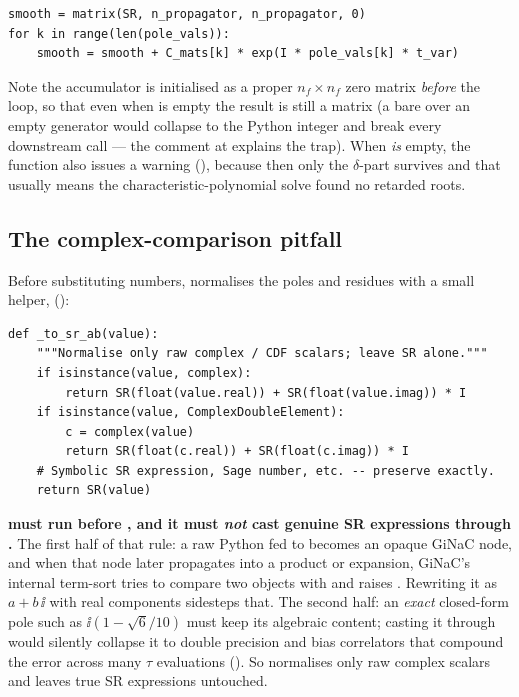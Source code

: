 \begin{lstlisting}
smooth = matrix(SR, n_propagator, n_propagator, 0)
for k in range(len(pole_vals)):
    smooth = smooth + C_mats[k] * exp(I * pole_vals[k] * t_var)
\end{lstlisting}

Note the accumulator is initialised as a proper $n_f \times n_f$ zero matrix
\emph{before} the loop, so that even when  is empty the result is
still a matrix (a bare  over an empty generator would collapse to the
Python integer  and break every downstream  call ---
the comment at  explains the trap). When
 \emph{is} empty, the function also issues a warning
(), because then only the $\delta$-part survives and
that usually means the characteristic-polynomial solve found no retarded roots.

\subsection{The complex-comparison pitfall}

Before substituting numbers,  normalises the poles and
residues with a small helper, 
():

\begin{lstlisting}
def _to_sr_ab(value):
    """Normalise only raw complex / CDF scalars; leave SR alone."""
    if isinstance(value, complex):
        return SR(float(value.real)) + SR(float(value.imag)) * I
    if isinstance(value, ComplexDoubleElement):
        c = complex(value)
        return SR(float(c.real)) + SR(float(c.imag)) * I
    # Symbolic SR expression, Sage number, etc. -- preserve exactly.
    return SR(value)
\end{lstlisting}

\begin{gotcha}
\textbf{ must run before , and it must
\emph{not} cast genuine SR expressions through .} The first half
of that rule: a raw Python  fed to  becomes an
opaque GiNaC node, and when that node later propagates into a product or
expansion, GiNaC's internal term-sort tries to compare two  objects
with \code{<} and raises . Rewriting it as $a + b\,\ii$ with real 
components sidesteps that. The second half: an \emph{exact} closed-form pole such
as $\ii(1 - \sqrt6/10)$ must keep its algebraic content; casting it through
 would silently collapse it to double precision and bias
correlators that compound the error across many $\tau$ evaluations
(). So  normalises only raw complex
scalars and leaves true SR expressions untouched.
\end{gotcha}

